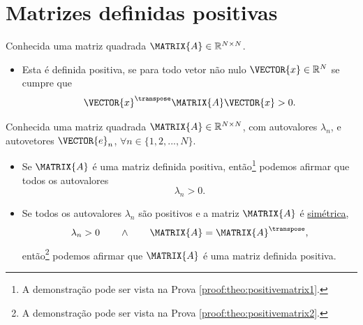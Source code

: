 \section{ Matrizes definidas positivas}


\begin{definition}\label{def:positivematrix0}
Conhecida uma matriz quadrada $\MATRIX{A} \in \mathbb{R}^{N \times N}$. 
\begin{itemize}
\item Esta é definida positiva, se para todo vetor não nulo $\VECTOR{x} \in \mathbb{R}^N$
se cumpre que \cite[pp. 159]{golub2013matrix} 
\begin{equation}
\VECTOR{x}^{\transpose} \MATRIX{A} \VECTOR{x} > 0.
\end{equation}
\end{itemize}
\end{definition}




\begin{theorem}\label{theo:positivematrix1}
Conhecida uma matriz quadrada $\MATRIX{A} \in \mathbb{R}^{N \times N}$, com  autovalores $\lambda_n$,
e autovetores $\VECTOR{e}_n$, $\forall n \in \{1, 2, ..., N\}$.
\begin{itemize}
\item Se $\MATRIX{A}$ é uma matriz definida positiva, então\footnote{\label{foot:theo:positivematrix1}A
demonstração pode ser vista na Prova \ref{proof:theo:positivematrix1}.}  
podemos afirmar que todos os autovalores 
\begin{equation}
\lambda_n > 0.
\end{equation}
\item Se todos os autovalores $\lambda_n$ são positivos e a matriz $\MATRIX{A}$ é \hyperref[def:symmetricmatrix0]{simétrica},
\begin{equation}
\lambda_n > 0 \qquad \wedge \qquad \MATRIX{A}=\MATRIX{A}^{\transpose},
\end{equation}
 então\footnote{A
demonstração pode ser vista na Prova \ref{proof:theo:positivematrix2}.} 
podemos afirmar que $\MATRIX{A}$ é uma matriz definida positiva.
\end{itemize}
\end{theorem}

